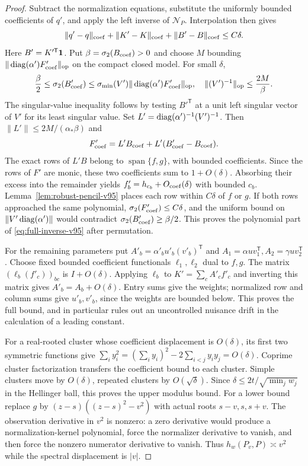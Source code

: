 \begin{proof}
Subtract the normalization equations, substitute the uniformly bounded
coefficients of $q'$, and apply the left inverse of $\mathcal N_P$.
Interpolation then gives
\[
 \|q'-q\|_{\rm coef}+\|K'-K\|_{\rm coef}
                   +\|B'-B\|_{\rm coef}\le C\delta.
\]
Here $B'=K'^{\mathsf T}\mathbf 1$. Put $\beta=\sigma_2(B_{\rm coef})>0$
and choose $M$ bounding $\|\operatorname{diag}(\alpha')F'_{\rm coef}\|_{\rm op}$
on the compact closed model. For small $\delta$,
\[
 {\beta\over2}\le\sigma_2(B'_{\rm coef})
 \le\sigma_{\min}(V')\|\operatorname{diag}(\alpha')F'_{\rm coef}\|_{\rm op},
 \quad \|(V')^{-1}\|_{\rm op}\le {2M\over\beta}.
\]
The singular-value inequality follows by testing $B'^{\mathsf T}$ at a
unit left singular vector of $V'$ for its least singular value.
Set $L'=\operatorname{diag}(\alpha')^{-1}(V')^{-1}$. Then
$\|L'\|\le2M/(\alpha_*\beta)$ and
\[
 F'_{\rm coef}=L'B_{\rm coef}+L'(B'_{\rm coef}-B_{\rm coef}).
\]
The exact rows of $L'B$ belong to $\operatorname{span}\{f,g\}$,
with bounded coefficients. Since the rows of $F'$ are monic, these two
coefficients sum to $1+O(\delta)$. Absorbing their excess into the
remainder yields $f'_b=h_{c_b}+O_{\rm coef}(\delta)$ with bounded
$c_b$. Lemma~\ref{lem:robust-pencil-v95} places each row within
$C\delta$ of $f$ or $g$. If both rows approached the same polynomial,
$\sigma_2(F'_{\rm coef})\le C\delta$, and the uniform bound on
$\|V'\operatorname{diag}(\alpha')\|$ would contradict
$\sigma_2(B'_{\rm coef})\ge\beta/2$. This proves the polynomial part
of \eqref{eq:full-inverse-v95} after permutation.

For the remaining parameters put
$A'_b=\alpha'_bu'_b(v'_b)^{\mathsf T}$ and
$A_1=\alpha uv_1^{\mathsf T}, A_2=\gamma uv_2^{\mathsf T}$.
Choose fixed bounded coefficient functionals $\ell_1,\ell_2$ dual to
$f,g$. The matrix $(\ell_b(f'_c))_{bc}$ is $I+O(\delta)$.
Applying $\ell_b$ to $K'=\sum_c A'_cf'_c$ and inverting this matrix
gives $A'_b=A_b+O(\delta)$. Entry sums give the weights; normalized
row and column sums give $u'_b,v'_b$, since the weights are bounded
below. This proves the full bound, and in particular rules out an
uncontrolled nuisance drift in the calculation of a leading constant.

For a real-rooted cluster whose coefficient displacement is $O(\delta)$,
its first two symmetric functions give
$\sum_i y_i^2=(\sum_i y_i)^2-2\sum_{i<j}y_iy_j=O(\delta)$.
Coprime cluster factorization transfers the coefficient bound to each
cluster. Simple clusters move by $O(\delta)$, repeated clusters by
$O(\sqrt\delta)$. Since $\delta\le2t/\sqrt{\min_jw_j}$ in the
Hellinger ball, this proves the upper modulus bound. For a lower bound
replace $g$ by $(z-s)((z-s)^2-v^2)$ with actual roots $s-v,s,s+v$.
The observation derivative in $v^2$ is nonzero: a zero derivative would
produce a normalization-kernel polynomial, force the normalizer derivative
to vanish, and then force the nonzero numerator derivative to vanish.
Thus $h_w(P_v,P)\asymp v^2$ while the spectral displacement is $|v|$.


\end{proof}
